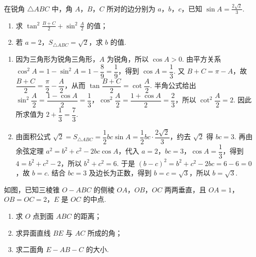 \begin{problem}
在锐角 \(\triangle ABC\) 中，角 \(A\)，\(B\)，\(C\) 所对的边分别为 \(a\)，\(b\)，\(c\)，已知 \(\sin A = \frac{2\sqrt{2}}{3}\).
\begin{enumerate}
\item 求 \(\tan^2\frac{B + C}{2} + \sin^2\frac{A}{2}\) 的值；
\item 若 \(a = 2\)，\(S_{\triangle ABC} = \sqrt{2}\)，求 \(b\) 的值.
\end{enumerate}
\end{problem}

\begin{solution}
\begin{enumerate}
\item 因为三角形为锐角三角形，\(A\) 为锐角，所以 \(\cos A>0\). 由平方关系 \(\cos^2A=1-\sin^2A=1-\dfrac89=\dfrac19\)，得到 \(\cos A=\dfrac13\). 又 \(B+C=\pi-A\)，故 \(\dfrac{B+C}{2}=\dfrac\pi2-\dfrac A2\)，从而 \(\tan\dfrac{B+C}{2}=\cot\dfrac A2\). 半角公式给出 \(\sin^2\dfrac A2=\dfrac{1-\cos A}{2}=\dfrac13\)，\(\cos^2\dfrac A2=\dfrac{1+\cos A}{2}=\dfrac23\)，所以 \(\cot^2\dfrac A2=2\). 因此所求值为 \(2+\dfrac13=\dfrac73\).
\item 由面积公式
\(\sqrt2=S_{\triangle ABC}=\dfrac12bc\sin A=\dfrac12bc\cdot\dfrac{2\sqrt2}{3}\)，约去 \(\sqrt2\) 得 \(bc=3\). 再由余弦定理
\(a^2=b^2+c^2-2bc\cos A\)，代入 \(a=2\)，\(bc=3\)，\(\cos A=\dfrac13\)，得到 \(4=b^2+c^2-2\)，所以 \(b^2+c^2=6\). 于是 \((b-c)^2=b^2+c^2-2bc=6-6=0\)，故 \(b=c\). 结合 \(bc=3\) 及边长为正数，得到 \(b=c=\sqrt3\)，所以 \(b=\sqrt3\).
\end{enumerate}
\end{solution}

\begin{problem}
如图，已知三棱锥 \(O - ABC\) 的侧棱 \(OA\)，\(OB\)，\(OC\) 两两垂直，且 \(OA = 1\)，\(OB = OC = 2\)，\(E\) 是 \(OC\) 的中点.

\begin{enumerate}
\item 求 \(O\) 点到面 \(ABC\) 的距离；
\item 求异面直线 \(BE\) 与 \(AC\) 所成的角；
\item 求二面角 \(E - AB - C\) 的大小.
\end{enumerate}

\end{problem}

